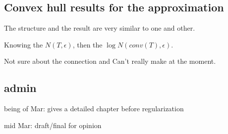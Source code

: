 \subsection*{Convex hull results for the approximation}

The structure and the result are very similar to one and other.

Knowing the $N(T, \epsilon)$, then the $\log N(conv(T), \epsilon)$.

Not sure about the connection and Can't really make at the moment.

\subsection*{admin}

being of Mar: gives a detailed chapter before regularization 

mid Mar: draft/final for opinion




